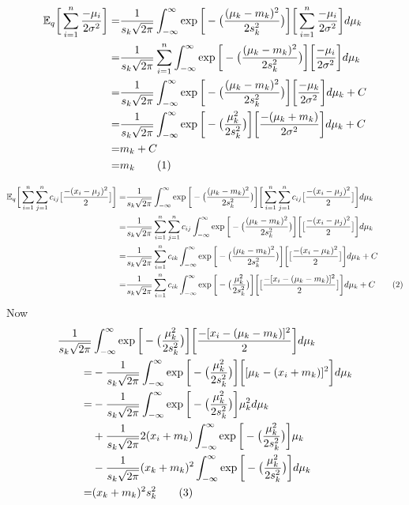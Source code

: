 \documentclass[]{article}
\newcommand{\Expectation} {\mathbb{E}}
\newcommand\numberthis    {\addtocounter{equation}{1}\tag{\theequation}}
\begin{document}
\begin{align*}
	\Expectation_q\bigg[\sum_{i=1}^{n} \frac{-\mu_i}{2\sigma^2}\bigg]=& 	\frac{1}{s_k\sqrt{2\pi}} \int_{-\infty}^{\infty} \exp{\bigg[-\big(\frac{(\mu_k-m_k)^2}{2 s_k^2}\big)\bigg]}\bigg[\sum_{i=1}^{n} \frac{-\mu_i}{2\sigma^2}\bigg] d \mu_k\\
	=& 	\frac{1}{s_k\sqrt{2\pi}} \sum_{i=1}^{n} \int_{-\infty}^{\infty} \exp{\bigg[-\big(\frac{(\mu_k-m_k)^2}{2 s_k^2}\big)\bigg]}\bigg[ \frac{-\mu_i}{2\sigma^2}\bigg] d \mu_k\\
	=& 	\frac{1}{s_k\sqrt{2\pi}} \int_{-\infty}^{\infty} \exp{\bigg[-\big(\frac{(\mu_k-m_k)^2}{2 s_k^2}\big)\bigg]}\bigg[ \frac{-\mu_k}{2\sigma^2}\bigg] d \mu_k + C\\
	=& 	\frac{1}{s_k\sqrt{2\pi}} \int_{-\infty}^{\infty} \exp{\bigg[-\big(\frac{\mu_k^2}{2 s_k^2}\big)\bigg]}\bigg[ \frac{-(\mu_k+m_k)}{2\sigma^2}\bigg] d \mu_k + C\\
	=&m_k + C\\
	=& m_k \numberthis \label{eq:ELBO:31}
\end{align*}

\begin{align*}
\Expectation_q\bigg[\sum_{i=1}^{n}\sum_{j=1}^{n} c_{ij}\big[\frac{-(x_i-\mu_j)^2}{2}\big]\bigg]=&\frac{1}{s_k\sqrt{2\pi}} \int_{-\infty}^{\infty} \exp{\bigg[-\big(\frac{(\mu_k-m_k)^2}{2 s_k^2}\big)\bigg]}\bigg[\sum_{i=1}^{n}\sum_{j=1}^{n} c_{ij}\big[\frac{-(x_i-\mu_j)^2}{2}\big]\bigg] d \mu_k\\
=&\frac{1}{s_k\sqrt{2\pi}} \sum_{i=1}^{n}\sum_{j=1}^{n} c_{ij} \int_{-\infty}^{\infty} \exp{\bigg[-\big(\frac{(\mu_k-m_k)^2}{2 s_k^2}\big)\bigg]}\bigg[\big[\frac{-(x_i-\mu_j)^2}{2}\big]\bigg] d \mu_k\\
=&\frac{1}{s_k\sqrt{2\pi}} \sum_{i=1}^{n} c_{ik} \int_{-\infty}^{\infty} \exp{\bigg[-\big(\frac{(\mu_k-m_k)^2}{2 s_k^2}\big)\bigg]}\bigg[\big[\frac{-(x_i-\mu_k)^2}{2}\big]\bigg] d \mu_k + C\\
=&\frac{1}{s_k\sqrt{2\pi}} \sum_{i=1}^{n} c_{ik} \int_{-\infty}^{\infty} \exp{\bigg[-\big(\frac{\mu_k^2}{2 s_k^2}\big)\bigg]}\bigg[\big[\frac{-[x_i-(\mu_k-m_k)]^2}{2}\big]\bigg] d \mu_k + C \numberthis \label{eq:ELBO:32}
\end{align*}
Now 
\begin{align*}
	\frac{1}{s_k\sqrt{2\pi}}& \int_{-\infty}^{\infty} \exp{\bigg[-\big(\frac{\mu_k^2}{2 s_k^2}\big)\bigg]}\bigg[\frac{-[x_i-(\mu_k-m_k)]^2}{2}\bigg] d \mu_k\\
	=&-\frac{1}{s_k\sqrt{2\pi}} \int_{-\infty}^{\infty} \exp{\bigg[-\big(\frac{\mu_k^2}{2 s_k^2}\big)\bigg]}\bigg[[\mu_k-(x_i+m_k)]^2\bigg] d \mu_k\\
	=& -\frac{1}{s_k\sqrt{2\pi}} \int_{-\infty}^{\infty} \exp{\bigg[-\big(\frac{\mu_k^2}{2 s_k^2}\big)\bigg]} \mu_k^2 d\mu_k\\
	 &+ \frac{1}{s_k\sqrt{2\pi}} 2(x_i+m_k) \int_{-\infty}^{\infty} \exp{\bigg[-\big(\frac{\mu_k^2}{2 s_k^2}\big)\bigg]} \mu_k\\
	 &-\frac{1}{s_k\sqrt{2\pi}} (x_k+m_k)^2 \int_{-\infty}^{\infty} \exp{\bigg[-\big(\frac{\mu_k^2}{2 s_k^2}\big)\bigg]} d \mu_k\\
	 =& (x_k+m_k)^2 s_k^2 \numberthis \label{eq:ELBO:33}
\end{align*}
\end{document}

